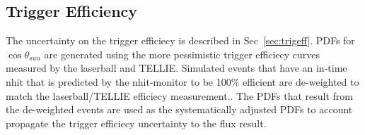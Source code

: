 \subsection{Trigger Efficiency}
The uncertainty on the trigger efficiecy is described in Sec~\ref{sec:trigeff}.
PDFs for $\cos\theta_{sun}$ are generated using the more pessimistic
trigger efficiecy curves measured by the laserball and TELLIE\@.
Simulated events that have an in-time nhit that is predicted by the nhit-monitor
to be 100\% efficient are de-weighted to match the laserball/TELLIE efficiecy
measurement..
The PDFs that result from the de-weighted events are used as the systematically
adjusted PDFs to account propagate the trigger efficiecy uncertainty to the
flux result.

